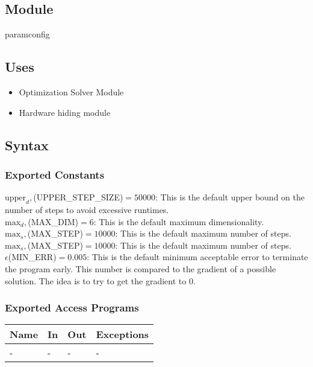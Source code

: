\documentclass[12pt, titlepage]{article}
\begin{document}
\subsection{Module}
paramconfig


\subsection{Uses}
\begin{itemize}
    \item Optimization Solver Module 
    \item Hardware hiding module
\end{itemize}

\subsection{Syntax}

\subsubsection{Exported Constants}
\noindent $\text{upper}_d,$(UPPER\_STEP\_SIZE)$ = 50000$: This is the default upper bound on the number of steps to avoid excessive runtimes.
\\

\noindent $\text{max}_d,$(MAX\_DIM)$ = 6$: This is the default maximum dimensionality.
\\

\noindent $\text{max}_s,$(MAX\_STEP)$ = 10000$: This is the default maximum number of steps.
\\

\noindent $\text{max}_s,$(MAX\_STEP)$ = 10000$: This is the default maximum number of steps.
\\

\noindent $\epsilon$(MIN\_ERR)$= 0.005$: This is the default minimum acceptable error to terminate the program early. This number is compared to the gradient of a possible solution. The idea is to try to get the gradient to 0.
\subsubsection{Exported Access Programs}

\begin{center}
\begin{tabular}{p{2cm} p{4cm} p{4cm} p{2cm}}
\hline
\textbf{Name} & \textbf{In} & \textbf{Out} & \textbf{Exceptions} \\
\hline
- & - & - & - \\
\hline
\end{tabular}
\end{center}
\end{document}
